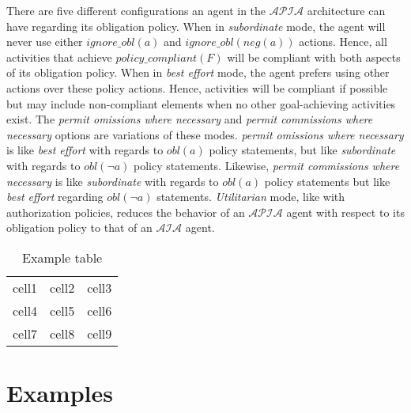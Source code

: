 There are five different configurations an agent in the $\mathcal{APIA}$ architecture can have regarding its obligation policy.
When in \textit{subordinate} mode, the agent will never use either $ignore\_obl(a)$ and $ignore\_obl(neg(a))$ actions.
Hence, all activities that achieve $policy\_compliant(F)$ will be compliant with both aspects of its obligation policy.
When in \textit{best effort} mode, the agent prefers using other actions over these policy actions.
Hence, activities will be compliant if possible but may include non-compliant elements when no other goal-achieving activities exist.
The \textit{permit omissions where necessary} and \textit{permit commissions where necessary} options are variations of these modes.
\textit{permit omissions where necessary} is like \textit{best effort} with regards to $obl(a)$ policy statements, but like \textit{subordinate} with regards to $obl(\neg a)$ policy statements.
Likewise, \textit{permit commissions where necessary} is like \textit{subordinate} with regards to $obl(a)$ policy statements but like \textit{best effort} regarding $obl(\neg a)$ statements.
\textit{Utilitarian} mode, like with authorization policies, reduces the behavior of an $\mathcal{APIA}$ agent with respect to its obligation policy to that of an $\mathcal{AIA}$ agent.

\begin{table}[h]
    \begin{tabular}{ c c c }
        cell1 & cell2 & cell3 \\
        cell4 & cell5 & cell6 \\
        cell7 & cell8 & cell9
    \end{tabular}
    \caption{Example table}
\end{table}

\section{Examples}

